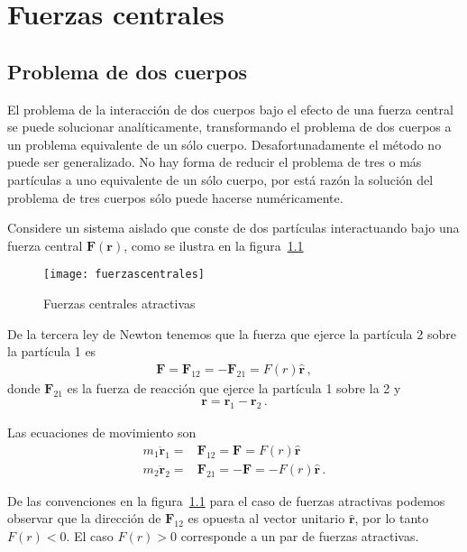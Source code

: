 \chapter{Fuerzas centrales}

\section{Problema de dos cuerpos}
El problema de la interacción de dos cuerpos bajo el efecto de una fuerza central se puede solucionar analíticamente, transformando el problema de dos cuerpos a un problema equivalente de un sólo cuerpo. Desafortunadamente el método no puede ser generalizado. No hay forma de reducir el problema de tres o más partículas a uno equivalente de un sólo cuerpo, por está razón la solución del problema de tres cuerpos sólo puede hacerse numéricamente. 

Considere un sistema aislado que conste de dos partículas interactuando bajo una fuerza central $\mathbf{F}(\mathbf{r})$, como se ilustra en la figura~\ref{fig:fuerzascentrales}
\begin{figure}
  \centering
  \texttt{[image: fuerzascentrales]}
  \caption{Fuerzas centrales atractivas}
  \label{fig:fuerzascentrales}
\end{figure}

De la tercera ley de Newton tenemos que la fuerza que ejerce la partícula 2 sobre la partícula 1 es
\begin{align}
  \mathbf{F}=\mathbf{F}_{12}=-\mathbf{F}_{21}=F(r)\hat{\mathbf{r}}\,,
\end{align}
donde $\mathbf{F}_{21}$ es la fuerza de reacción que ejerce la partícula 1 sobre la 2 y
\begin{align}
  \label{eq:rcentral}
  \mathbf{r}=\mathbf{r}_1-\mathbf{r}_2\,.
\end{align}

Las ecuaciones de movimiento son
\begin{align}
  \label{eq:edmfc}
  m_1\ddot{\mathbf{r}}_1=&\mathbf{F}_{12}=\mathbf{F}=F(r)\hat{\mathbf{r}}\nonumber\\
  m_2\ddot{\mathbf{r}}_2=&\mathbf{F}_{21}=-\mathbf{F}=-F(r)\hat{\mathbf{r}}\,.
\end{align}

De las convenciones en la figura~\ref{fig:fuerzascentrales} para el caso de fuerzas atractivas podemos observar que la dirección de $\mathbf{F}_{12}$ es opuesta al vector unitario $\hat{\mathbf{r}}$, por lo tanto $F(r)<0$. El caso $F(r)>0$ corresponde a un par de fuerzas atractivas. 

